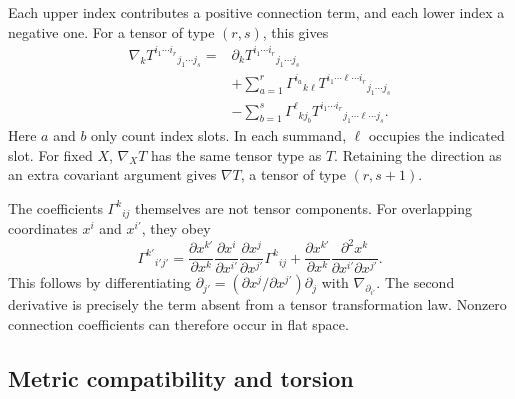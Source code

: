 \documentclass[11pt,a4paper]{article}
\numberwithin{equation}{section}
\newcommand{\slidesref}[1]{\par\nobreak\smallskip\nobreak{\footnotesize\color{ink!60}\textsc{Source slides #1}}\par\nobreak\smallskip\nobreak}
\begin{document}
Each upper index contributes a positive connection term, and each lower
index a negative one. For a tensor of type \((r,s)\), this gives
\begin{equation}
 \begin{aligned}
 \nabla_k T^{i_1\cdots i_r}{}_{j_1\cdots j_s}
 ={}&\partial_k T^{i_1\cdots i_r}{}_{j_1\cdots j_s}\\
 &+\sum_{a=1}^{r}\Gamma^{i_a}{}_{k\ell}
    T^{i_1\cdots \ell\cdots i_r}{}_{j_1\cdots j_s}\\
 &-\sum_{b=1}^{s}\Gamma^\ell{}_{k j_b}
    T^{i_1\cdots i_r}{}_{j_1\cdots \ell\cdots j_s}.
 \end{aligned}
 \label{gr2:eq:tensor-derivative}
\end{equation}
Here \(a\) and \(b\) only count index slots. In each summand, \(\ell\)
occupies the indicated slot. For fixed \(X\), \(\nabla_XT\) has the same
tensor type as \(T\). Retaining the direction as an extra covariant
argument gives \(\nabla T\), a tensor of type \((r,s+1)\).

The coefficients \(\Gamma^k{}_{ij}\) themselves are not tensor components.
For overlapping coordinates \(x^i\) and \(x^{i'}\), they obey
\begin{equation}
 \Gamma^{k'}{}_{i'j'}
 =\frac{\partial x^{k'}}{\partial x^k}
  \frac{\partial x^i}{\partial x^{i'}}
  \frac{\partial x^j}{\partial x^{j'}}\Gamma^k{}_{ij}
 +\frac{\partial x^{k'}}{\partial x^k}
  \frac{\partial^2x^k}{\partial x^{i'}\partial x^{j'}}.
 \label{gr2:eq:connection-transformation}
\end{equation}
This follows by differentiating
\(\partial_{j'}=(\partial x^j/\partial x^{j'})\partial_j\)
with \(\nabla_{\partial_{i'}}\). The second derivative is precisely the
term absent from a tensor transformation law. Nonzero connection
coefficients can therefore occur in flat space.

\subsection{Metric compatibility and torsion}
\slidesref{5--7}
\end{document}
